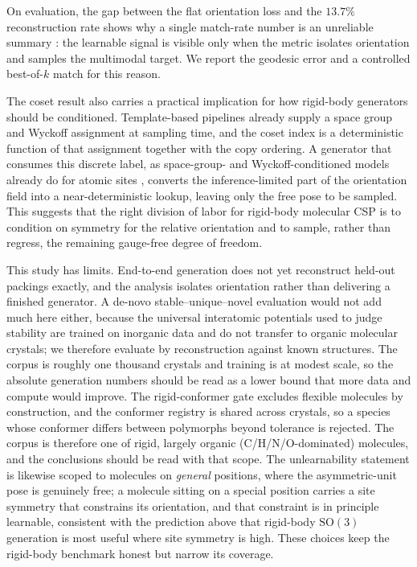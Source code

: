 \documentclass[10pt]{article}
\begin{document}
On evaluation, the gap between the flat orientation loss and the $13.7\%$
reconstruction rate shows why a single match-rate number is an unreliable
summary \citep{martirossyan2025matching}: the learnable signal is visible only
when the metric isolates orientation and samples the multimodal target. We
report the geodesic error and a controlled best-of-$k$ match for this reason.

The coset result also carries a practical implication for how rigid-body
generators should be conditioned. Template-based pipelines already supply a
space group and Wyckoff assignment at sampling time, and the coset index is a
deterministic function of that assignment together with the copy ordering. A
generator that consumes this discrete label, as space-group- and
Wyckoff-conditioned models already do for atomic
sites \citep{jiao2024diffcsppp,wyckoffdiff2025,symmcd2025}, converts the
inference-limited part of the orientation field into a near-deterministic
lookup, leaving only the free pose to be sampled. This suggests that
the right division of labor for rigid-body molecular CSP is to condition on
symmetry for the relative orientation and to sample, rather than regress, the
remaining gauge-free degree of freedom.

This study has limits. End-to-end generation does not yet reconstruct held-out
packings exactly, and the analysis isolates orientation rather than delivering a
finished generator. A de-novo stable--unique--novel evaluation would not add much
here either, because the universal interatomic potentials used to judge stability
are trained on inorganic data \citep{deng2023chgnet} and do not transfer to organic
molecular crystals; we therefore evaluate by reconstruction against known
structures. The corpus is roughly one thousand crystals and training is at modest
scale, so the absolute generation numbers should be read as a lower bound that
more data and compute would improve. The rigid-conformer gate excludes flexible
molecules by construction, and the conformer registry is shared across crystals,
so a species whose conformer differs between polymorphs beyond tolerance is
rejected. The corpus is therefore one of rigid, largely organic
(C/H/N/O-dominated) molecules, and the conclusions should be read with that
scope. The unlearnability statement is likewise scoped to molecules on
\emph{general} positions, where the asymmetric-unit pose is genuinely free; a
molecule sitting on a special position carries a site symmetry that constrains
its orientation, and that constraint is in principle learnable, consistent with
the prediction above that rigid-body $\mathrm{SO}(3)$ generation is most useful
where site symmetry is high. These choices keep the rigid-body benchmark honest
but narrow its coverage.
\end{document}
